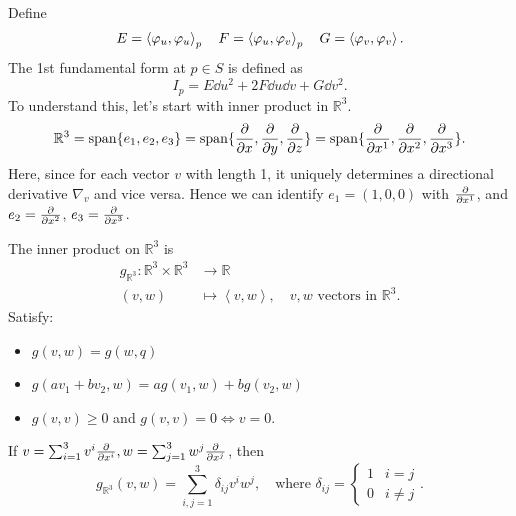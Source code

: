 Define \[
    E=\left<\varphi_u,\varphi_u\right>_p\quad F=\left<\varphi_u,\varphi_v\right>_p\quad
    G=\left<\varphi_v,\varphi_v\right>.
\] The 1st fundamental form at \(p\in S\) is defined as \[
    I_p=E\dd{u}^2+2F\dd{u}\dd{v}+G\dd{v}^2
.\] To understand this, let's start with inner product in \(\mathbb{R}^3\). \[
    \mathbb{R}^3=\operatorname{span}\{e_1,e_2,e_3\}=\operatorname{span}\{\pdv{x},\pdv{y},\pdv{z}\}
    =\operatorname{span}\{\pdv{x^1},\pdv{x^2},\pdv{x^3}\}.
\] Here, since for each vector \(v\) with length 1, it uniquely determines a
directional derivative \(\nabla_v\) and vice versa.
Hence we can identify \(e_1=(1,0,0)\) with \(\pdv{x^1}\), and \(e_2=\pdv{x^2}\),
\(e_3=\pdv{x^3}\).

The inner product on \(\mathbb{R}^3\) is
\begin{align*}
    g_{\mathbb{R}^3}\colon\mathbb{R}^3\times\mathbb{R}^3&\longrightarrow\mathbb{R}\\
    (v,w) &\longmapsto \left<v,w\right>,
    \quad v,w \text{ vectors in }\mathbb{R}^3
.\end{align*}
Satisfy:
\begin{itemize}
    \item \(g(v,w)=g(w,q)\)
    \item \(g(av_1+bv_2,w)=ag(v_1,w)+bg(v_2,w)\)
    \item \(g(v,v)\ge 0\) and \(g(v,v)=0\iff v=0\).
\end{itemize}
If \(v=\sum_{i=1}^3 v^i\pdv{x^i},w=\sum_{j=1}^{3}w^j\pdv{x^j}\), then \[
    g_{\mathbb{R}^3}(v,w)=\sum_{i,j=1}^{3}\delta_{ij}v^i w^j,
    \quad \text{where }\delta_{ij}=\begin{cases}
        1 & i=j\\
        0 & i\neq j
    \end{cases}
.\] 

